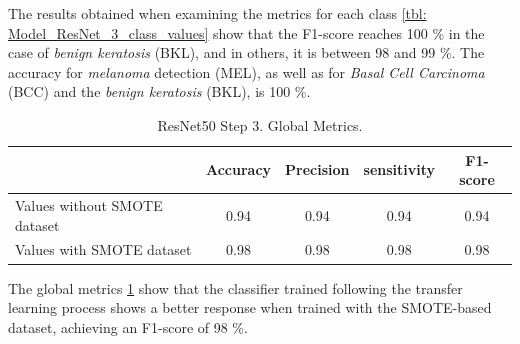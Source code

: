 \begin{table}[ht]
\centering
{}
    \caption{ResNet50 Step 3. Metrics obtained by class.}
    \label{tbl: Model_ResNet_3_class_values}
\end{table}

The results obtained when examining the metrics for each class \ref{tbl: Model_ResNet_3_class_values} show that the F1-score reaches 100 \% in the case of \textit{benign keratosis} (BKL), and in others, it is between 98 and 99 \%. The accuracy for \textit{melanoma} detection (MEL), as well as for \textit{Basal Cell Carcinoma} (BCC) and the \textit{benign keratosis} (BKL), is 100 \%. 

\begin{table}[ht]
\centering
\begin{tabular}{lcccc}
\cline{2-5}
 & \textbf{Accuracy} & \textbf{Precision} & \textbf{sensitivity} & \textbf{F1-score} \\ \hline
Values without SMOTE dataset & 0.94 & 0.94 & 0.94 & 0.94 \\ \hline
Values with SMOTE dataset & 0.98 & 0.98 & 0.98 & 0.98 \\ \hline
\end{tabular}
    \caption{ResNet50 Step 3. Global Metrics.}
    \label{tbl: Model_RNet50_3_global_values}
\end{table}

The global metrics \ref{tbl: Model_RNet50_3_global_values} show that the classifier trained following the transfer learning process shows a better response when trained with the SMOTE-based dataset, achieving an F1-score of 98 \%.